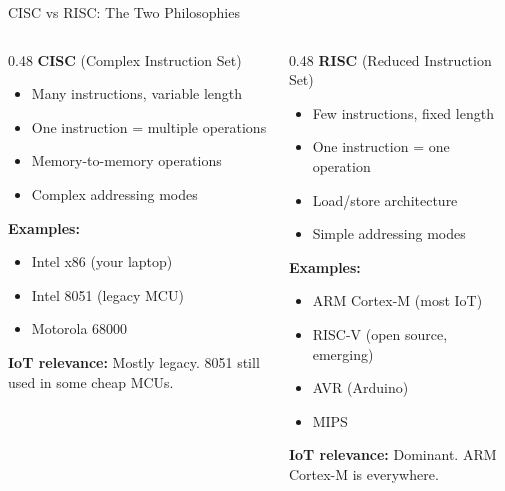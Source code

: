 \documentclass[aspectratio=169,11pt]{beamer}
\begin{document}
\begin{frame}{CISC vs RISC: The Two Philosophies}
    \begin{columns}[T]
        \begin{column}{0.48\textwidth}
            \textbf{CISC} (Complex Instruction Set)
            \begin{itemize}
                \item Many instructions, variable length
                \item One instruction = multiple operations
                \item Memory-to-memory operations
                \item Complex addressing modes
            \end{itemize}
            
            \vspace{0.2cm}
            \textbf{Examples:}
            \begin{itemize}
                \item Intel x86 (your laptop)
                \item Intel 8051 (legacy MCU)
                \item Motorola 68000
            \end{itemize}
            
            \vspace{0.2cm}
            \textbf{IoT relevance:} Mostly legacy. 8051 still used in some cheap MCUs.
        \end{column}
        \begin{column}{0.48\textwidth}
            \textbf{RISC} (Reduced Instruction Set)
            \begin{itemize}
                \item Few instructions, fixed length
                \item One instruction = one operation
                \item Load/store architecture
                \item Simple addressing modes
            \end{itemize}
            
            \vspace{0.2cm}
            \textbf{Examples:}
            \begin{itemize}
                \item ARM Cortex-M (most IoT)
                \item RISC-V (open source, emerging)
                \item AVR (Arduino)
                \item MIPS
            \end{itemize}
            
            \vspace{0.2cm}
            \textbf{IoT relevance:} Dominant. ARM Cortex-M is everywhere.
        \end{column}
    \end{columns}
\end{frame}
\end{document}

